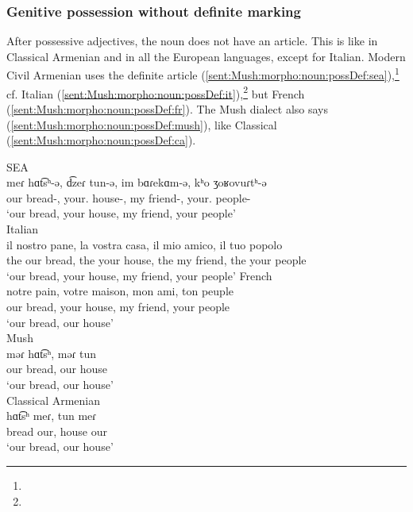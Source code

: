 \subsubsection{Genitive possession without definite marking} 

After possessive adjectives, the noun does not have an article. This is like in Classical Armenian and in all the European languages, except for Italian. Modern Civil Armenian uses the definite article (\ref{sent:Mush:morpho:noun:possDef:sea}),\footnote{} cf. Italian (\ref{sent:Mush:morpho:noun:possDef:it}),\footnote{} but French (\ref{sent:Mush:morpho:noun:possDef:fr}). The Mush dialect also says (\ref{sent:Mush:morpho:noun:possDef:mush}), like Classical (\ref{sent:Mush:morpho:noun:possDef:ca}). 

\begin{exe}
	\ex \begin{xlist}
		\ex SEA \label{sent:Mush:morpho:noun:possDef:sea} \\ \gll
		meɾ hɑt͡sʰ-ə, d͡zeɾ tun-ə, im bɑɾekɑm-ə, kʰo ʒoʁovuɾtʰ-ə \\
		our bread-{}, your.{\pl} house-{}, my friend-{}, your.{\sg} people-{} \\
		\trans `our bread, your house, my friend, your people' \\ 
		\ex Italian\label{sent:Mush:morpho:noun:possDef:it} \\  \gll
		il nostro pane, la vostra casa, il mio amico, il tuo popolo
		\\ the our bread, the your house, the my friend, the your people \\
		\trans `our bread, your house, my friend, your people'
		\ex French\label{sent:Mush:morpho:noun:possDef:fr}\\  \gll 
		notre pain, votre maison, mon ami, ton peuple \\
		our bread, your house, my friend, your people\\
		\trans `our bread, our house' \\
		\ex Mush \label{sent:Mush:morpho:noun:possDef:mush} \\ \gll
		məɾ hɑt͡sʰ, məɾ tun \\
		our bread, our house \\
		\trans `our bread, our house' \\
		\ex Classical Armenian \label{sent:Mush:morpho:noun:possDef:ca} \\ \gll
		hɑt͡sʰ meɾ, tun meɾ \\
		bread our, house our\\
			\trans `our bread, our house' \\
	\end{xlist}
\end{exe}

